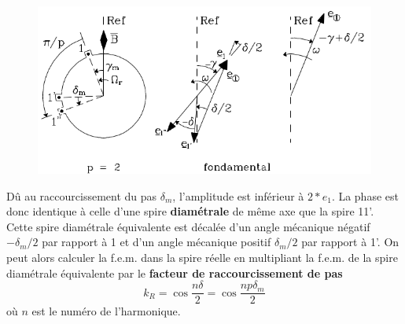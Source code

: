 	\begin{figure}
	\vspace{-5mm}
	\includegraphics[scale=0.38]{ch5/image7.png}
	\end{figure}
	Dû au raccourcissement du pas $\delta_m$, l'amplitude est inférieur à $2*e_1$. La 
	phase est donc identique à celle d'une spire \textbf{diamétrale} de même axe que 
	la spire 11'. Cette spire diamétrale équivalente est décalée d'un angle mécanique 
	négatif $-\delta_m/2$ par rapport à 1 et d'un angle mécanique positif $\delta_m/2$ 
	par rapport à 1'. On peut alors calculer la f.e.m. dans la spire réelle en multipliant 
	la f.e.m. de la spire diamétrale équivalente par le \textbf{facteur de raccourcissement 
	de pas }
	\begin{equation}
	k_R = \cos\dfrac{n\delta}{2}=\cos\dfrac{np\delta_m}{2}
	\end{equation}
	où $n$ est le numéro de l'harmonique.
	
